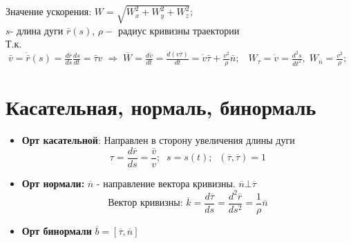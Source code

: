 \documentclass[12pt]{article}
\begin{document}
	Значение ускорения: $W=\sqrt{W_x^2+W_y^2+W_z^2};$ \\
	 $s $- длина дуги $\bar{r}(s)$, $\rho - $ радиус кривизны траектории \\
	Т.к.  $\;\bar{v}=\dot{\bar{r}}(s)= \frac{d\bar{r}}{ds}\frac{ds}{dt} = \bar{\tau}v  \; \Rightarrow \; \overline{W}=\frac{d\bar{v}}{dt}=\frac{d(v\bar{\tau})}{dt}=\dot{v}\bar{\tau}+ \frac{v^2}{\rho} \bar{n}; \;\;\; 
	W_\tau=\dot{v} = \frac{d^2s}{dt^2}, \; W_{\bar{n}}=\frac{v^2}{\rho}; $ 

\section{Касательная, нормаль, бинормаль}
	\begin{itemize}
		\item \textbf{Орт касательной}: 
		Направлен в сторону увеличения длины дуги
			$$\tau=\frac{d\overline{r}}{ds}= \frac{\bar{v}}{v}; \;\; s=s(t); \;\; (\overline{\tau}, \overline{\tau})=1$$
		\item \textbf{Орт нормали: } $\overline{n}$ - направление вектора кривизны. $\overline{n} \bot \overline{\tau}$
			$$\text{Вектор кривизны: } \overline{k} = \frac{d\overline{\tau}}{ds} = \frac{d^2\overline{r}}{ds^2} = \frac{1}{\rho} \overline{n}$$
		\item \textbf{Орт бинормали } $\overline{b}=[ \overline{\tau},\overline{n}] $
	\end{itemize}
\end{document}

